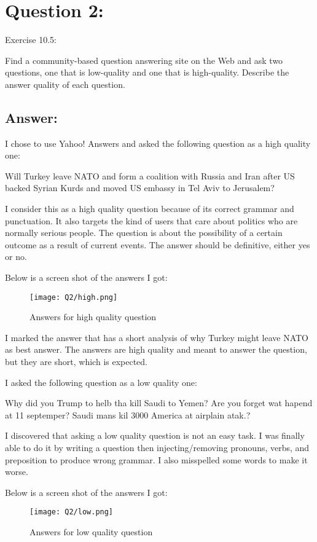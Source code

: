 \section*{Question 2:}
Exercise 10.5: 

Find a community-based question answering site on the Web and ask two questions, one that is low-quality and one that is high-quality. Describe the answer quality of each question.

\subsection*{Answer:}

I chose to use Yahoo! Answers and asked the following question as a high quality one:


Will Turkey leave NATO and form a coalition with Russia and Iran after US backed Syrian Kurds and moved US embassy in Tel Aviv to Jerusalem?

I consider this as a high quality question because of its correct grammar and punctuation. It also targets the kind of users that care about politics who are normally serious people. The question is about the possibility of a certain outcome as a result of current events. The answer should be definitive, either yes or no.

Below is a screen shot of the answers I got:


\begin{figure}[h]
\caption{Answers for high quality question}
\centering
\texttt{[image: Q2/high.png]}
\end{figure}


I marked the answer that has a short analysis of why Turkey might leave NATO as best answer. The answers are high quality and meant to answer the question, but they are short, which is expected.  

I asked the following question as a low quality one: 

Why did you Trump to helb tha kill Saudi to Yemen? Are you forget wat hapend at 11 septemper? Saudi mans kil 3000 America at airplain atak.?

I discovered that asking a low quality question is not an easy task. I was finally able to do it by writing a question then injecting/removing pronouns, verbs, and preposition to produce wrong grammar. I also misspelled some words to make it worse. 

Below is a screen shot of the answers I got:


\begin{figure}[h]
\caption{Answers for low quality question}
\centering
\texttt{[image: Q2/low.png]}
\end{figure}


